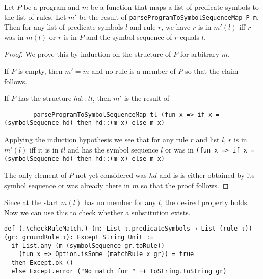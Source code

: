 \begin{lemma}[\parseProgramToSymbolSequenceMapmem]\label{lem:parseProgramToSymbolSequenceMap}
    Let $P$ be a program and $m$ be a function that maps a list of predicate symbols to the list of rules. Let $m'$ be the result of \lstinline|parseProgramToSymbolSequenceMap P m|. Then for any list of predicate symbols $l$ and rule $r$, we have $r$ is in $m'(l)$ iff $r$ was in $m(l)$ or $r$ is in $P$ and the symbol sequence of $r$ equals $l$.
\end{lemma}
\begin{proof}
    We prove this by induction on the structure of $P$ for arbitrary $m$.

    If $P$ is empty, then $m' = m$ and no rule is a member of $P$ so that the claim follows.

    If $P$ has the structure $hd::tl$, then $m'$ is the result of 

    \begin{lstlisting}
        parseProgramToSymbolSequenceMap tl (fun x => if x = (symbolSequence hd) then hd::(m x) else m x)
    \end{lstlisting}

    Applying the induction hypothesis we see that for any rule $r$ and list $l$, $r$ is in $m'(l)$ iff it is in $tl$ and has the symbol sequence $l$ or was in \lstinline|(fun x => if x = (symbolSequence hd) then hd::(m x) else m x)|

    The only element of $P$ not yet considered was $hd$ and is is either obtained by its symbol sequence or was already there in $m$ so that the proof follows.
\end{proof}

Since at the start $m(l)$ has no member for any $l$, the desired property holds. Now we can use this to check whether a substitution exists.

\begin{lstlisting}
def (.\checkRuleMatch.) (m: List τ.predicateSymbols → List (rule τ)) (gr: groundRule τ): Except String Unit :=
  if List.any (m (symbolSequence gr.toRule)) 
    (fun x => Option.isSome (matchRule x gr)) = true
  then Except.ok ()
  else Except.error ("No match for " ++ ToString.toString gr)
\end{lstlisting}

